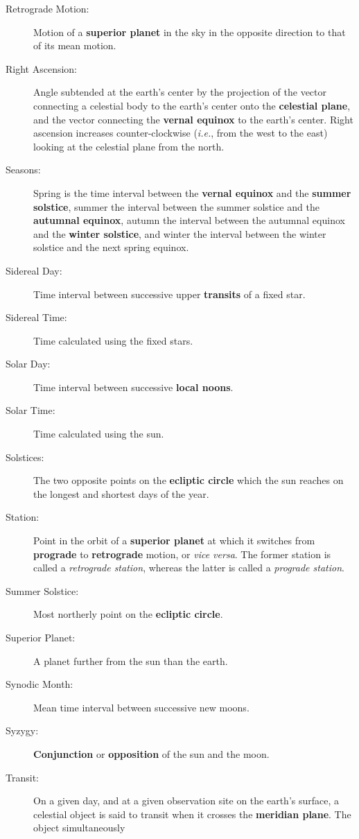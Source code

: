 {\begin{description}
\item [Retrograde Motion:] Motion of a {\bf superior
planet}\/ in the sky in the opposite direction to that of its mean motion.
\item [Right Ascension:] Angle subtended at the earth's center by the projection
of the vector connecting a celestial body to the earth's center
onto the {\bf celestial plane}, and the vector connecting the
{\bf vernal equinox}\/ to the earth's center. Right ascension increases counter-clockwise ({\em i.e.}, from the west to the east) looking at the
celestial plane from the north.
\item [Seasons:] Spring is the time interval between the {\bf vernal equinox}\/
and the {\bf summer solstice}, summer the  interval between the
summer solstice and the {\bf autumnal equinox}, autumn the interval
between the autumnal equinox and the {\bf winter solstice}, and
winter the interval between the winter solstice and the next spring equinox.
\item [Sidereal Day:] Time interval between successive upper
{\bf transits}\/ of a fixed star. 
\item [Sidereal Time:] Time calculated using the fixed stars. 
\item [Solar Day:] Time interval between successive {\bf local noons}.
\item [Solar Time:] Time calculated using the sun.
\item [Solstices:] The two opposite points on the {\bf ecliptic circle}\/ which  the sun reaches  on the longest and shortest days of the
year.
\item[Station:] Point in the orbit of a {\bf superior planet}\/ at
which it switches from {\bf prograde}\/ to {\bf retrograde}\/ motion,
or {\em vice versa}. The former station is called a {\em retrograde station},
whereas the latter is called a {\em prograde station}. 
\item [Summer Solstice:] Most northerly point on the {\bf ecliptic circle}.
\item [Superior Planet:] A planet further from the sun than the earth.
\item[Synodic Month:] Mean time interval between successive
new moons.
\item[Syzygy:] {\bf Conjunction}\/ or {\bf opposition}\/ of the sun and the moon.
\item [Transit:] On a given day, and at a given observation site on the earth's
surface, a celestial object is said to transit when it crosses the {\bf meridian plane}. The object simultaneously

\end{description}}
